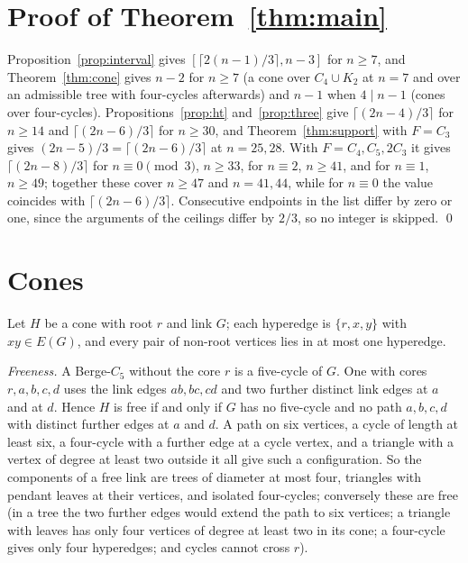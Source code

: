 \documentclass[11pt]{article}
\theoremstyle{remark}
\begin{document}
\section{Proof of Theorem~\ref{thm:main}}\label{sec:proofmain}

Proposition~\ref{prop:interval} gives $[\lceil2(n-1)/3\rceil,n-3]$ for
$n\ge7$, and Theorem~\ref{thm:cone} gives $n-2$ for $n\ge7$ (a cone over
$C_4\cup K_2$ at $n=7$ and over an admissible tree with four-cycles
afterwards) and $n-1$ when $4\mid n-1$ (cones over four-cycles).
Propositions~\ref{prop:ht} and~\ref{prop:three} give $\lceil(2n-4)/3\rceil$
for $n\ge14$ and $\lceil(2n-6)/3\rceil$ for $n\ge30$, and
Theorem~\ref{thm:support} with $F=C_3$ gives $(2n-5)/3=\lceil(2n-6)/3\rceil$
at $n=25,28$. With $F=C_4,C_5,2C_3$ it gives $\lceil(2n-8)/3\rceil$ for
$n\equiv0\pmod3$, $n\ge33$, for $n\equiv2$, $n\ge41$, and for $n\equiv1$,
$n\ge49$; together these cover $n\ge47$ and $n=41,44$, while for
$n\equiv0$ the value coincides with $\lceil(2n-6)/3\rceil$. Consecutive
endpoints in the list differ by zero or one, since the arguments of the
ceilings differ by $2/3$, so no integer is skipped. \qed

\section{Cones}\label{sec:cones}

Let $H$ be a cone with root $r$ and link $G$; each hyperedge is
$\{r,x,y\}$ with $xy\in E(G)$, and every pair of non-root vertices lies in
at most one hyperedge.

\emph{Freeness.} A Berge-$C_5$ without the core $r$ is a five-cycle of $G$.
One with cores $r,a,b,c,d$ uses the link edges $ab,bc,cd$ and two further
distinct link edges at $a$ and at $d$. Hence $H$ is free if and only if $G$
has no five-cycle and no path $a,b,c,d$ with distinct further edges at $a$
and $d$. A path on six vertices, a cycle of length at least six, a
four-cycle with a further edge at a cycle vertex, and a triangle with a
vertex of degree at least two outside it all give such a configuration.
So the components of a free link are trees of diameter at most four,
triangles with pendant leaves at their vertices, and isolated four-cycles;
conversely these are free (in a tree the two further edges would extend
the path to six vertices; a triangle with leaves has only four vertices of
degree at least two in its cone; a four-cycle gives only four hyperedges;
and cycles cannot cross $r$).
\end{document}
